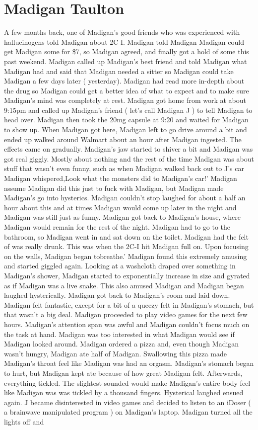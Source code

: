 \documentclass[12pt]{book}
\begin{document}
\chapter{Madigan Taulton}

A few months back, one of Madigan's good friends who was experienced with hallucinogens told Madigan about 2C-I. Madigan told Madigan Madigan could get Madigan some for \$7, so Madigan agreed, and finally got a hold of some this past weekend. Madigan called up Madigan's best friend and told Madigan what Madigan had and said that Madigan needed a sitter so Madigan could take Madigan a few days later ( yesterday). Madigan had read more in-depth about the drug so Madigan could get a better idea of what to expect and to make sure Madigan's mind was completely at rest. Madigan got home from work at about 9:15pm and called up Madigan's friend ( let's call Madigan J ) to tell Madigan to head over. Madigan then took the 20mg capsule at 9:20 and waited for Madigan to show up. When Madigan got here, Madigan left to go drive around a bit and ended up walked around Walmart about an hour after Madigan ingested. The effects came on gradually. Madigan's jaw started to shiver a bit and Madigan was got real giggly. Mostly about nothing and the rest of the time Madigan was about stuff that wasn't even funny, such as when Madigan walked back out to J's car Madigan whispered,Look what the monsters did to Madigan's car!' Madigan assume Madigan did this just to fuck with Madigan, but Madigan made Madigan's go into hysterics. Madigan couldn't stop laughed for about a half an hour about this and at times Madigan would come up later in the night and Madigan was still just as funny. Madigan got back to Madigan's house, where Madigan would remain for the rest of the night. Madigan had to go to the bathroom, so Madigan went in and sat down on the toilet. Madigan had the felt of was really drunk. This was when the 2C-I hit Madigan full on. Upon focusing on the walls, Madigan began tobreathe.' Madigan found this extremely amusing and started giggled again. Looking at a washcloth draped over something in Madigan's shower, Madigan started to exponentially increase in size and gyrated as if Madigan was a live snake. This also amused Madigan and Madigan began laughed hysterically. Madigan got back to Madigan's room and laid down. Madigan felt fantastic, except for a bit of a queezy felt in Madigan's stomach, but that wasn't a big deal. Madigan proceeded to play video games for the next few hours. Madigan's attention span was awful and Madigan couldn't focus much on the task at hand. Madigan was too interested in what Madigan would see if Madigan looked around. Madigan ordered a pizza and, even though Madigan wasn't hungry, Madigan ate half of Madigan. Swallowing this pizza made Madigan's throat feel like Madigan was had an orgasm. Madigan's stomach began to hurt, but Madigan kept ate because of how great Madigan felt. Afterwards, everything tickled. The slightest sounded would make Madigan's entire body feel like Madigan was was tickled by a thousand fingers. Hysterical laughed ensued again. J became disinterested in video games and decided to listen to an iDoser ( a brainwave manipulated program ) on Madigan's laptop. Madigan turned all the lights off and 
\end{document}
